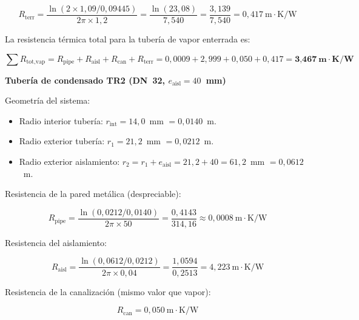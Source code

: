 \begin{equation}
	R_{\text{terr}} = \frac{\ln(2 \times 1{,}09 / 0{,}09445)}{2\pi \times 1{,}2} = \frac{\ln(23{,}08)}{7{,}540} = \frac{3{,}139}{7{,}540} = 0{,}417~\text{m}\cdot\text{K/W}
	\label{eq:resist_terr_TR2_vap}
\end{equation}

La resistencia térmica total para la tubería de vapor enterrada es:

\begin{equation}
	\sum R_{\text{tot,vap}} = R_{\text{pipe}} + R_{\text{aisl}} + R_{\text{can}} + R_{\text{terr}} = 0{,}0009 + 2{,}999 + 0{,}050 + 0{,}417 = \textbf{3{,}467}~\textbf{m}\cdot\textbf{K/W}
	\label{eq:resist_total_TR2_vap}
\end{equation}

\textbf{Tubería de condensado TR2 (DN~32, $e_{\text{aisl}} = 40$~mm)}

Geometría del sistema:

\begin{itemize}[noitemsep]
	\item Radio interior tubería: $r_{\text{int}} = 14{,}0$~mm $= 0{,}0140$~m.
	\item Radio exterior tubería: $r_1 = 21{,}2$~mm $= 0{,}0212$~m.
	\item Radio exterior aislamiento: $r_2 = r_1 + e_{\text{aisl}} = 21{,}2 + 40 = 61{,}2$~mm $= 0{,}0612$~m.
\end{itemize}

Resistencia de la pared metálica (despreciable):

\begin{equation}
	R_{\text{pipe}} = \frac{\ln(0{,}0212 / 0{,}0140)}{2\pi \times 50} = \frac{0{,}4143}{314{,}16} \approx 0{,}0008~\text{m}\cdot\text{K/W}
	\label{eq:resist_pipe_TR2_cond}
\end{equation}

Resistencia del aislamiento:

\begin{equation}
	R_{\text{aisl}} = \frac{\ln(0{,}0612 / 0{,}0212)}{2\pi \times 0{,}04} = \frac{1{,}0594}{0{,}2513} = 4{,}223~\text{m}\cdot\text{K/W}
	\label{eq:resist_aisl_TR2_cond}
\end{equation}

Resistencia de la canalización (mismo valor que vapor):

\begin{equation}
	R_{\text{can}} = 0{,}050~\text{m}\cdot\text{K/W}
	\label{eq:resist_can_TR2_cond}
\end{equation}

